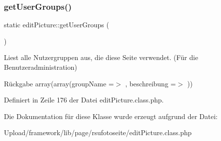 \subsubsection{\texorpdfstring{get\+User\+Groups()}{getUserGroups()}}
{\footnotesize\ttfamily static edit\+Picture\+::get\+User\+Groups (\begin{DoxyParamCaption}{ }\end{DoxyParamCaption})\hspace{0.3cm}{\ttfamily [static]}}

Liest alle Nutzergruppen aus, die diese Seite verwendet. (Für die Benutzeradministration) \begin{DoxyReturn}{Rückgabe}
array(array(\textquotesingle{}group\+Name\textquotesingle{} =$>$ \textquotesingle{}\textquotesingle{}, \textquotesingle{}beschreibung\textquotesingle{} =$>$ \textquotesingle{}\textquotesingle{})) 
\end{DoxyReturn}


Definiert in Zeile 176 der Datei edit\+Picture.\+class.\+php.



Die Dokumentation für diese Klasse wurde erzeugt aufgrund der Datei\+:\begin{DoxyCompactItemize}
\item 
Upload/framework/lib/page/rsufotoseite/edit\+Picture.\+class.\+php\end{DoxyCompactItemize}
